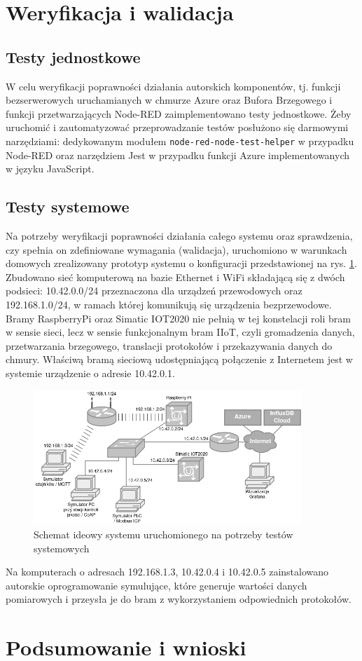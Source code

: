 \documentclass[a4paper, 12pt, twoside]{article}
\begin{document}
\newpage
\section{Weryfikacja i walidacja}\label{testy}

\subsection{Testy jednostkowe}

W celu weryfikacji poprawności działania autorskich komponentów, tj. 
funkcji bezserwerowych uruchamianych w chmurze Azure oraz Bufora Brzegowego i funkcji przetwarzających Node-RED 
zaimplementowano testy jednostkowe. Żeby uruchomić i zautomatyzować przeprowadzanie
testów posłużono się darmowymi narzędziami: dedykowanym modułem \texttt{node-red-node-test-helper}
w przypadku Node-RED oraz narzędziem Jest w przypadku funkcji Azure implementowanych
w języku JavaScript.

\subsection{Testy systemowe}

Na potrzeby weryfikacji poprawności działania całego systemu oraz sprawdzenia,
czy spełnia on zdefiniowane wymagania (walidacja), uruchomiono w warunkach
domowych zrealizowany prototyp systemu o konfiguracji przedstawionej na rys. \ref{fig:network}.
Zbudowano sieć komputerową na bazie Ethernet i WiFi składającą się z dwóch 
podsieci: 10.42.0.0/24 przeznaczona dla urządzeń przewodowych oraz 
192.168.1.0/24, w ramach której komunikują się urządzenia bezprzewodowe.
Bramy RaspberryPi oraz Simatic IOT2020 nie pełnią w tej konstelacji roli 
bram w sensie sieci, lecz w sensie funkcjonalnym bram IIoT, czyli gromadzenia danych, przetwarzania
brzegowego, translacji protokołów i przekazywania danych do chmury. 
Właściwą bramą sieciową udostępniającą połączenie z Internetem jest w systemie urządzenie o adresie 10.42.0.1. 

\begin{figure}[h]
      \centering
      \includegraphics[width=0.9\textwidth]{network.png}
      \caption{Schemat ideowy systemu uruchomionego na potrzeby testów systemowych}
      \label{fig:network}
\end{figure}

Na komputerach o adresach 192.168.1.3, 10.42.0.4 i 10.42.0.5 zainstalowano
autorskie oprogramowanie symulujące, które generuje wartości danych pomiarowych
i przeysła je do bram z wykorzystaniem odpowiednich protokołów. 

\section{Podsumowanie i wnioski}\label{wnioski}

\newpage
\printbibliography
\end{document}

